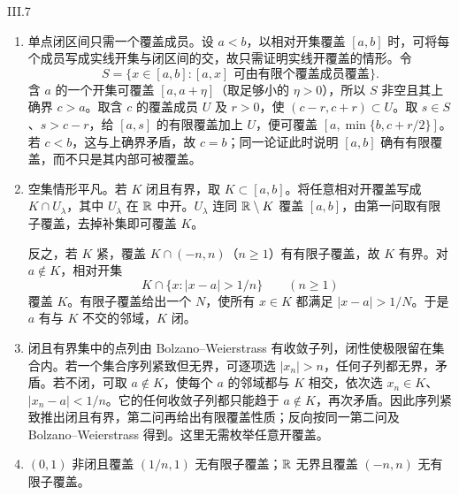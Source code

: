 \begin{solution}{III.7}
\begin{enumerate}
 \item 单点闭区间只需一个覆盖成员。设 \(a<b\)，以相对开集覆盖 \([a,b]\) 时，可将每个成员写成实线开集与闭区间的交，故只需证明实线开覆盖的情形。令
 \[
 S=\{x\in[a,b]:[a,x]\text{ 可由有限个覆盖成员覆盖}\}.
 \]
 含 \(a\) 的一个开集可覆盖 \([a,a+\eta]\)（取足够小的 \(\eta>0\)），所以 \(S\) 非空且其上确界 \(c>a\)。取含 \(c\) 的覆盖成员 \(U\) 及 \(r>0\)，使 \((c-r,c+r)\subset U\)。取 \(s\in S\)、\(s>c-r\)，给 \([a,s]\) 的有限覆盖加上 \(U\)，便可覆盖 \([a,\min\{b,c+r/2\}]\)。若 \(c<b\)，这与上确界矛盾，故 \(c=b\)；同一论证此时说明 \([a,b]\) 确有有限覆盖，而不只是其内部可被覆盖。
 \item 空集情形平凡。若 \(K\) 闭且有界，取 \(K\subset[a,b]\)。将任意相对开覆盖写成 \(K\cap U_\lambda\)，其中 \(U_\lambda\) 在 \(\mathbb{R}\) 中开。\(U_\lambda\) 连同 \(\mathbb{R}\setminus K\) 覆盖 \([a,b]\)，由第一问取有限子覆盖，去掉补集即可覆盖 \(K\)。

 反之，若 \(K\) 紧，覆盖 \(K\cap(-n,n)\)（\(n\ge1\)）有有限子覆盖，故 \(K\) 有界。对 \(a\notin K\)，相对开集
 \[
 K\cap\{x:|x-a|>1/n\}\qquad(n\ge1)
 \]
 覆盖 \(K\)。有限子覆盖给出一个 \(N\)，使所有 \(x\in K\) 都满足 \(|x-a|>1/N\)。于是 \(a\) 有与 \(K\) 不交的邻域，\(K\) 闭。
 \item 闭且有界集中的点列由 Bolzano--Weierstrass 有收敛子列，闭性使极限留在集合内。若一个集合序列紧致但无界，可逐项选 \(|x_n|>n\)，任何子列都无界，矛盾。若不闭，可取 \(a\notin K\)，使每个 \(a\) 的邻域都与 \(K\) 相交，依次选 \(x_n\in K\)、\(|x_n-a|<1/n\)。它的任何收敛子列都只能趋于 \(a\notin K\)，再次矛盾。因此序列紧致推出闭且有界，第二问再给出有限覆盖性质；反向按同一第二问及 Bolzano--Weierstrass 得到。这里无需枚举任意开覆盖。
 \item \((0,1)\) 非闭且覆盖 \((1/n,1)\) 无有限子覆盖；\(\mathbb{R}\) 无界且覆盖 \((-n,n)\) 无有限子覆盖。
\end{enumerate}
\end{solution}

